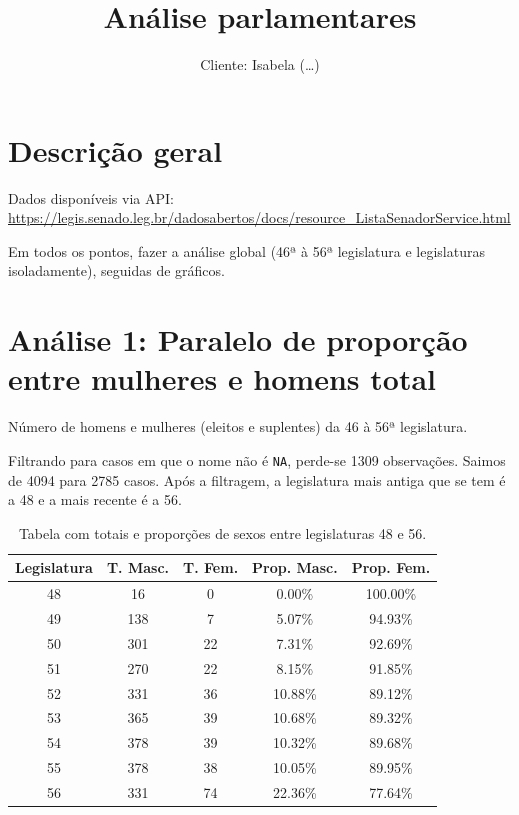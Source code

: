 \documentclass[
  letterpaper,
  DIV=11,
  numbers=noendperiod]{scrartcl}
\title{Análise parlamentares}
\subtitle{Cliente: Isabela (\ldots)}
\author{}
\date{}
\renewcommand*\contentsname{Table of contents}
\newcommand\contentsname{Table of contents}
\begin{document}
\maketitle
\ifdefined\Shaded\renewenvironment{Shaded}{\begin{tcolorbox}[borderline west={3pt}{0pt}{shadecolor}, interior hidden, enhanced, breakable, boxrule=0pt, frame hidden, sharp corners]}{\end{tcolorbox}}\fi

\renewcommand*\contentsname{Table of contents}
{
\hypersetup{linkcolor=}
\setcounter{tocdepth}{2}
\tableofcontents
}
\newpage{}

\hypertarget{descriuxe7uxe3o-geral}{%
\section{Descrição geral}\label{descriuxe7uxe3o-geral}}

Dados disponíveis via API:
\url{https://legis.senado.leg.br/dadosabertos/docs/resource_ListaSenadorService.html}

Em todos os pontos, fazer a análise global (46ª à 56ª legislatura e
legislaturas isoladamente), seguidas de gráficos.

\hypertarget{anuxe1lise-1-paralelo-de-proporuxe7uxe3o-entre-mulheres-e-homens-total}{%
\section{Análise 1: Paralelo de proporção entre mulheres e homens
total}\label{anuxe1lise-1-paralelo-de-proporuxe7uxe3o-entre-mulheres-e-homens-total}}

Número de homens e mulheres (eleitos e suplentes) da 46 à 56ª
legislatura.

Filtrando para casos em que o nome não é \texttt{NA}, perde-se 1309
observações. Saimos de 4094 para 2785 casos. Após a filtragem, a
legislatura mais antiga que se tem é a 48 e a mais recente é a 56.

\begin{longtable}{ccccc}
\caption{Tabela com totais e proporções de sexos entre legislaturas 48 e 56.}\tabularnewline

\toprule
Legislatura & T. Masc. & T. Fem. & Prop. Masc. & Prop. Fem.\\
\midrule
48 & 16 & 0 & 0.00\% & 100.00\%\\
49 & 138 & 7 & 5.07\% & 94.93\%\\
50 & 301 & 22 & 7.31\% & 92.69\%\\
51 & 270 & 22 & 8.15\% & 91.85\%\\
52 & 331 & 36 & 10.88\% & 89.12\%\\
53 & 365 & 39 & 10.68\% & 89.32\%\\
54 & 378 & 39 & 10.32\% & 89.68\%\\
55 & 378 & 38 & 10.05\% & 89.95\%\\
56 & 331 & 74 & 22.36\% & 77.64\%\\
\bottomrule
\end{longtable}
\end{document}
